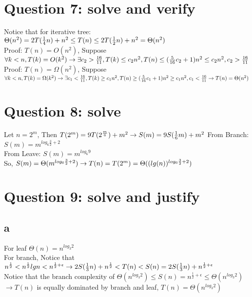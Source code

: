 \documentclass[]{article}
\begin{document}
\section{Question 7: solve and verify}

Notice that for iterative tree: \\
$\Theta (n^2) = 2T(\frac{1}{4}n) + n^2 \le T(n) \le 2T(\frac{1}{2}n) + n^2 = \Theta (n^2)\\$
\\
Proof: $T(n) = O(n^2)$, Suppose $\forall k < n, T(k) = O(k^2)\\
\rightarrow \exists c_{2}>\frac{16}{11}, T(k) \le c_{2}n^2, T(n) \le (\frac{5}{16}c_{2} + 1)n^{2} \le c_{2}n^2, c_{2}>\frac{16}{11} \\$
\\
Proof: $T(n) = \Omega(n^2)$, Suppose $\forall k < n, T(k) = \Omega(k^2)\\
\rightarrow \exists c_{1}<\frac{16}{11}, T(k) \ge c_{1}n^2, T(n) \ge (\frac{5}{16}c_{1} + 1)n^{2} \ge c_{1}n^2, c_{1}<\frac{16}{11} \\
\rightarrow T(n) = \Theta(n^2)$\\

\section{Question 8: solve}
Let $n = 2^m$, Then $T(2^m) = 9T(2^{\frac{m}{6}}) + m^2\\
\rightarrow S(m) = 9S(\frac{1}{6}m) + m^2\\$
From Branch: $S(m) = m^{log_{6}\frac{3}{2} + 2}$\\
From Leave: $S(m) = m^{log_{6}9}$\\
So, $S(m) = \Theta (m^{log_{6}\frac{3}{2} + 2}) \\
\rightarrow T(n) = T(2^m) = \Theta((lg(n))^{log_{6}\frac{3}{2} + 2})$

\section{Question 9: solve and justify}
\subsection{a}
For leaf $\Theta(n) = n^{log_{3}2}$\\
For branch, Notice that $n^{\frac{1}{2}} <n^{\frac{1}{2}}lgn < n^{\frac{1}{2} + \epsilon}\\
\rightarrow 2S(\frac{1}{3}n) + n^{\frac{1}{2}} < T(n) < S(n) = 2S(\frac{1}{3}n) + n^{\frac{1}{2} + \epsilon}$\\
Notice that the branch complexity of $\Theta(n^{log_{3}2}) \le S(n) = n^{\frac{1}{2}+\epsilon} \le \Theta(n^{log_{3}2})$\\
$\rightarrow T(n)$ is equally dominated by branch and leaf, $T(n) = \Theta(n^{log_{3}2})$
\end{document}
